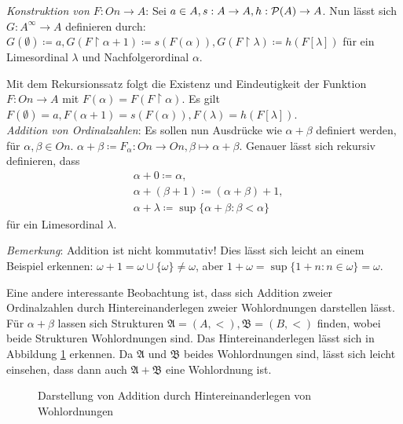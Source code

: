 \textit{Konstruktion von $F:On\to A$}: Sei $a\in A,s:A\to A, h: \mathcal{P}(A)\to A$. Nun lässt sich $G:A^\infty\to A$ definieren durch: $G(\emptyset)\coloneqq a, G(F\upharpoonright\alpha+1)\coloneqq s(F(\alpha)), G(F\upharpoonright\lambda)\coloneqq h(F[\lambda])$ für ein Limesordinal $\lambda$ und Nachfolgerordinal $\alpha$.

Mit dem Rekursionssatz folgt die Existenz und Eindeutigkeit der Funktion $F:On\to A$ mit $F(\alpha)=F(F\upharpoonright\alpha)$. Es gilt $F(\emptyset)=a, F(\alpha+1)=s(F(\alpha)), F(\lambda)=h(F[\lambda])$.\\

\textit{Addition von Ordinalzahlen}: Es sollen nun Ausdrücke wie $\alpha+\beta$ definiert werden, für $\alpha,\beta\in On$. $\alpha+\beta\coloneqq F_\alpha:On\to On, \beta\mapsto\alpha+\beta$. 
Genauer lässt sich rekursiv definieren, dass 
\begin{align*}
	&\alpha+0\coloneqq\alpha,\\
	&\alpha+(\beta+1)\coloneqq(\alpha+\beta)+1,\\ 
	&\alpha+\lambda\coloneqq\sup\{\alpha+\beta : \beta < \alpha\}
\end{align*}
für ein Limesordinal $\lambda$.

\textit{Bemerkung}: Addition ist nicht kommutativ! Dies lässt sich leicht an einem Beispiel erkennen: $\omega+1=\omega\cup\{\omega\}\neq\omega$, aber $1+\omega=\sup\{1+n:n\in\omega\}=\omega$.

Eine andere interessante Beobachtung ist, dass sich Addition zweier Ordinalzahlen durch \glqq Hintereinanderlegen\grqq{} zweier Wohlordnungen darstellen lässt. Für $\alpha+\beta$ lassen sich Strukturen $\mathfrak{A}=(A,<), \mathfrak{B}=(B,<)$ finden, wobei beide Strukturen Wohlordnungen sind. Das \glqq Hintereinanderlegen\grqq{} lässt sich in Abbildung \ref{AdditionWO} erkennen. Da $\mathfrak{A}$ und $\mathfrak{B}$ beides Wohlordnungen sind, lässt sich leicht einsehen, dass dann auch $\mathfrak{A}+\mathfrak{B}$ eine Wohlordnung ist.
	
\begin{figure}[h]
	\begin{center}
	\end{center}
	\caption{Darstellung von Addition durch \glqq Hintereinanderlegen\grqq{} von Wohlordnungen}
	\label{AdditionWO}
\end{figure}

